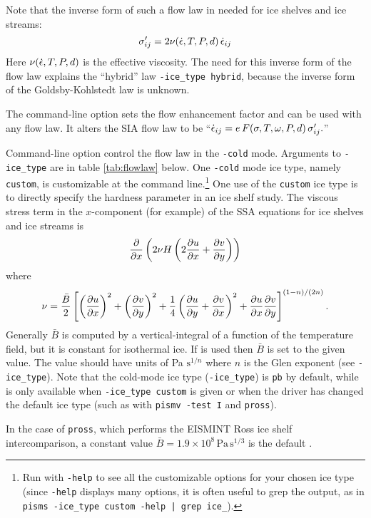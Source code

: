 Note that the inverse form of such a flow law in needed for ice shelves and ice streams:
	$$\sigma_{ij}' = 2 \nu(\dot{\epsilon},T,P,d)\,\dot {\epsilon}_{ij} $$
Here $\nu(\dot {\epsilon},T,P,d)$ is the effective viscosity.  The need for this inverse form of the flow law explains the ``hybrid'' law \texttt{-ice_type hybrid}, because the inverse form of the Goldsby-Kohlstedt law is unknown.

The command-line option  sets the flow enhancement factor and can be used with any flow law.  It alters the SIA flow law to be ``$\dot {\epsilon}_{ij} = e\, F(\sigma,T,\omega,P,d)\, \sigma_{ij}'.$''

Command-line option  control the flow law in the \texttt{-cold} mode.  Arguments to \texttt{-ice_type} are in table \ref{tab:flowlaw} below.  One \texttt{-cold} mode ice type, namely \texttt{custom}, is customizable at the command line.\footnote{Run with \texttt{-help} to see all the customizable options for your chosen ice type (since \texttt{-help} displays many options, it is often useful to grep the output, as in \texttt{pisms -ice_type custom -help | grep ice_}).}  One use of the \texttt{custom} ice type is to directly specify the hardness parameter in an ice shelf study.  The viscous stress term in the $x$-component (for example) of the SSA equations for ice shelves and ice streams is
	$$\frac{\partial }{\partial x}\left(2\nu H\left(2\frac{\partial u}{\partial x} + \frac{\partial v}{\partial y}\right)\right)$$
where 
	$$\nu = \frac{\bar B}{2} \left[\left(\frac{\partial u}{\partial x}\right)^2 + \left(\frac{\partial v}{\partial y}\right)^2 +
  \frac{1}{4} \left(\frac{\partial u}{\partial y} + \frac{\partial v}{\partial x}\right)^2 + \frac{\partial u}{\partial x}\frac{\partial v}{\partial y}\right]^{(1-n)/(2n)}.$$
Generally $\bar B$ is computed by a vertical-integral of a function of the temperature field, but it is constant for isothermal ice.  If  is used then $\bar B$ is set to the given value.  The value should have units of Pa $\text{s}^{1/n}$ where $n$ is the Glen exponent (see \texttt{-ice_type}).  Note that the cold-mode ice type (\texttt{-ice_type}) is \texttt{pb} by default, while  is only available when \texttt{-ice_type custom} is given or when the driver has changed the default ice type (such as with \texttt{pismv -test I} and \texttt{pross}).

In the case of \texttt{pross}, which performs the EISMINT Ross ice shelf intercomparison, a constant value $\bar B = 1.9 \times 10^8 \, \text{Pa}\, \text{s}^{1/3}$ is the default \cite{MacAyealetal}.

